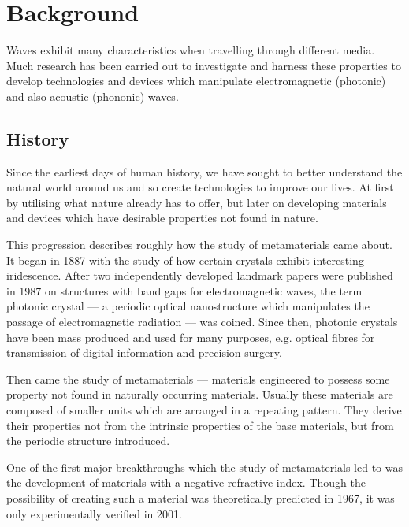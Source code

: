 \chapter{Background}
Waves exhibit many characteristics when travelling through different media.
Much research has been carried out to investigate and harness these properties
to develop technologies and devices which manipulate electromagnetic (photonic)
and also acoustic (phononic) waves.

\section{History}
Since the earliest days of human history, we have sought to better understand
the natural world around us and so create technologies to improve our lives. At
first by utilising what nature already has to offer, but later on developing
materials and devices which have desirable properties not found in nature.

This progression describes roughly how the study of metamaterials came about.
It began in 1887 with the study of how certain crystals exhibit interesting
iridescence.\cite{pcearliest} After two independently developed landmark papers
were published in 1987 on structures with band gaps for electromagnetic
waves,\cite{pceli,pcjohn} the term photonic crystal --- a periodic optical
nanostructure which manipulates the passage of electromagnetic radiation ---
was coined.\cite{pcfocus} Since then, photonic crystals have been mass produced
and used for many purposes, e.g. optical fibres for transmission of digital
information \cite{pcopfib} and precision surgery.\cite{pcsurgery,pcneuro}

Then came the study of metamaterials --- materials engineered to possess some
property not found in naturally occurring materials.\cite{briefintro} Usually
these materials are composed of smaller units which are arranged in a repeating
pattern. They derive their properties not from the intrinsic properties of the
base materials, but from the periodic structure introduced.

One of the first major breakthroughs which the study of metamaterials led to
was the development of materials with a negative refractive index. Though the
possibility of creating such a material was theoretically predicted in
1967,\cite{negrefrac} it was only experimentally verified in
2001.\cite{negrefracex}

